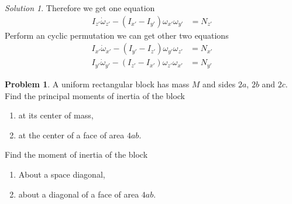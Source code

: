 \documentclass[twoside,11pt]{article}
\newcommand{\lms}{\fontfamily{lmss}\selectfont} %
\theoremstyle{definition}
\newtheorem{problem}{\lms Problem}
\theoremstyle{remark}
\newtheorem*{solution}{Solution}
\begin{document}
\begin{solution}
Therefore we get one equation
\begin{align*}
    I_{z'}\dot \omega_{z'} - (I_{x'} - I_{y'})\omega_{x'}\omega_{y'} &= N_{z'}
\end{align*}
Perform an cyclic permutation we can get other two equations
\begin{align*}
    I_{x'}\dot \omega_{x'} - (I_{y'} - I_{z'})\omega_{y'}\omega_{z'} &= N_{x'}\\
    I_{y'}\dot \omega_{y'} - (I_{z'} - I_{x'})\omega_{z'}\omega_{x'} &= N_{y'}
\end{align*}

\end{solution}



\begin{problem}
A uniform rectangular block has mass $M$ and sides $2a$, $2b$ and $2c$.
Find the principal moments of inertia of the block
\begin{enumerate}[label=\roman*)]
\item at its center of mass,
\item at the center of a face of area $4ab$.
\end{enumerate}
Find the moment of inertia of the block
\begin{enumerate}[label=\roman*)]
\item About a space diagonal,
\item about a diagonal of a face of area $4ab$.
\end{enumerate}
\end{problem}
\end{document}
